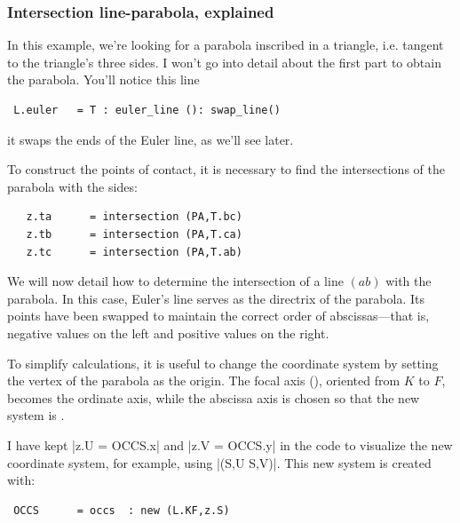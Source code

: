 \subsubsection{Intersection line-parabola, explained} %
\label{ssub:intersection_line_parabola_explained}

In this example, we're looking for a parabola inscribed in a triangle, i.e. tangent to the triangle's three sides.
I won't go into detail about the first part to obtain the parabola. You'll notice this line

\begin{mybox}
\begin{verbatim}
 L.euler   = T : euler_line (): swap_line()
\end{verbatim}
\end{mybox}

it swaps the ends of the Euler line, as we'll see later.

 To construct the points of contact, it is necessary to find the intersections of the parabola with the sides:

\begin{mybox}
\begin{Verbatim}
   z.ta      = intersection (PA,T.bc)
   z.tb      = intersection (PA,T.ca)
   z.tc      = intersection (PA,T.ab)
\end{Verbatim}
\end{mybox}

We will now detail how to determine the intersection of a line $(ab)$ with the parabola. In this case, Euler's line serves as the directrix of the parabola. Its points have been swapped to maintain the correct order of abscissas—that is, negative values on the left and positive values on the right.

To simplify calculations, it is useful to change the coordinate system by setting the vertex of the parabola as the origin. The focal axis (), oriented from $K$ to $F$, becomes the ordinate axis, while the abscissa axis is chosen so that the new system is .

I have kept |z.U = OCCS.x| and |z.V = OCCS.y| in the code to visualize the new coordinate system, for example, using |\tkzDrawSegments[red,->](S,U S,V)|. This new system is created with:

\begin{mybox}
\begin{Verbatim}
 OCCS      = occs  : new (L.KF,z.S)
\end{Verbatim}
\end{mybox}


